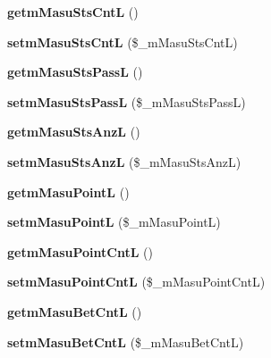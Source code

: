 \begin{DoxyCompactItemize}
{\bfseries getm\+Masu\+Sts\+CntL} ()
\item 
\mbox{\label{class_reversi_a6a504f963054c7931d021ef63f99b86e}} 
{\bfseries setm\+Masu\+Sts\+CntL} (\$\+\_\+m\+Masu\+Sts\+CntL)
\item 
\mbox{\label{class_reversi_a3f9ad087f95c8e5f31ef050e63c89247}} 
{\bfseries getm\+Masu\+Sts\+PassL} ()
\item 
\mbox{\label{class_reversi_a3a4da0cd20c0b5dfca9be0815601ccc5}} 
{\bfseries setm\+Masu\+Sts\+PassL} (\$\+\_\+m\+Masu\+Sts\+PassL)
\item 
\mbox{\label{class_reversi_a5d376e79bf04bb31b383db61b151bcdb}} 
{\bfseries getm\+Masu\+Sts\+AnzL} ()
\item 
\mbox{\label{class_reversi_a36b350417fa59ab47a67c00c4accf938}} 
{\bfseries setm\+Masu\+Sts\+AnzL} (\$\+\_\+m\+Masu\+Sts\+AnzL)
\item 
\mbox{\label{class_reversi_ade5dc108155b6e6f6395154438720b93}} 
{\bfseries getm\+Masu\+PointL} ()
\item 
\mbox{\label{class_reversi_ad9bd42936ec274c9fa618cc8ece556cd}} 
{\bfseries setm\+Masu\+PointL} (\$\+\_\+m\+Masu\+PointL)
\item 
\mbox{\label{class_reversi_a25055af3ec722a3825942a9926a444fa}} 
{\bfseries getm\+Masu\+Point\+CntL} ()
\item 
\mbox{\label{class_reversi_a5087882e3eb4cf95cade4af6b3dba950}} 
{\bfseries setm\+Masu\+Point\+CntL} (\$\+\_\+m\+Masu\+Point\+CntL)
\item 
\mbox{\label{class_reversi_a62cbae970465838c48134d8776bc9fce}} 
{\bfseries getm\+Masu\+Bet\+CntL} ()
\item 
\mbox{\label{class_reversi_a5ef49272f519ffeec78b4a40a838703c}} 
{\bfseries setm\+Masu\+Bet\+CntL} (\$\+\_\+m\+Masu\+Bet\+CntL)
\item 
\mbox{\label{class_reversi_a400f08e1bdbfbd48883c7ad9bcd980f2}} 

\end{DoxyCompactItemize}

